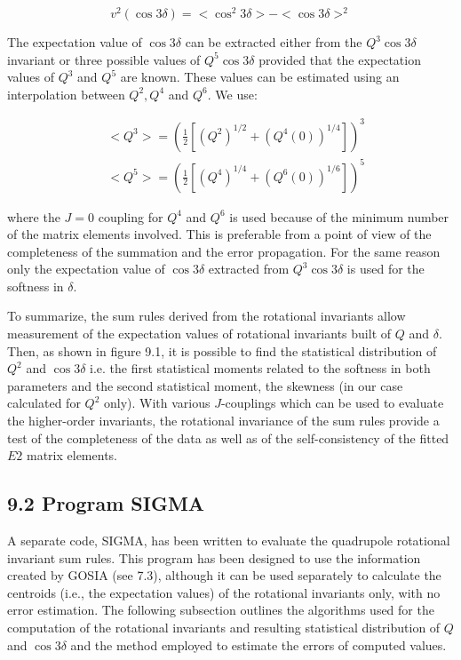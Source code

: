 \documentclass[10pt]{article}
\begin{document}
\begin{equation*}
v^{2}(\cos 3 \delta)=<\cos ^{2} 3 \delta>-<\cos 3 \delta>^{2} \tag{9.25}
\end{equation*}


The expectation value of $\cos 3 \delta$ can be extracted either from the $Q^{3} \cos 3 \delta$ invariant or three possible values of $Q^{5} \cos 3 \delta$ provided that the expectation values of $Q^{3}$ and $Q^{5}$ are known. These values can be estimated using an interpolation between $Q^{2}, Q^{4}$ and $Q^{6}$. We use:


\begin{align*}
& <Q^{3}>=\left(\frac{1}{2}\left[\left(Q^{2}\right)^{1 / 2}+\left(Q^{4}(0)\right)^{1 / 4}\right]\right)^{3}  \tag{9.26}\\
& <Q^{5}>=\left(\frac{1}{2}\left[\left(Q^{4}\right)^{1 / 4}+\left(Q^{6}(0)\right)^{1 / 6}\right]\right)^{5} \tag{9.27}
\end{align*}


where the $J=0$ coupling for $Q^{4}$ and $Q^{6}$ is used because of the minimum number of the matrix elements involved. This is preferable from a point of view of the completeness of the summation and the error propagation. For the same reason only the expectation value of $\cos 3 \delta$ extracted from $Q^{3} \cos 3 \delta$ is used for the softness in $\delta$.

To summarize, the sum rules derived from the rotational invariants allow measurement of the expectation values of rotational invariants built of $Q$ and $\delta$. Then, as shown in figure 9.1, it is possible to find the statistical distribution of $Q^{2}$ and $\cos 3 \delta$ i.e. the first statistical moments related to the softness in both parameters and the second statistical moment, the skewness (in our case calculated for $Q^{2}$ only). With various $J$-couplings which can be used to evaluate the higher-order invariants, the rotational invariance of the sum rules provide a test of the completeness of the data as well as of the self-consistency of the fitted $E 2$ matrix elements.

\subsection*{9.2 Program SIGMA}
A separate code, SIGMA, has been written to evaluate the quadrupole rotational invariant sum rules. This program has been designed to use the information created by GOSIA (see 7.3), although it can be used separately to calculate the centroids (i.e., the expectation values) of the rotational invariants only, with no error estimation. The following subsection outlines the algorithms used for the computation of the rotational invariants and resulting statistical distribution of $Q$ and $\cos 3 \delta$ and the method employed to estimate the errors of computed values.
\end{document}
